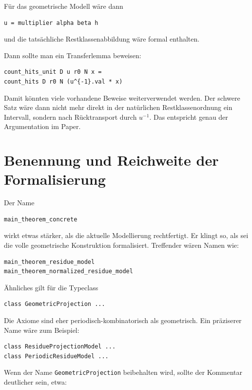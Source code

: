 \documentclass[11pt]{article}
\begin{document}
Für das geometrische Modell wäre dann

\begin{lstlisting}
u = multiplier alpha beta h
\end{lstlisting}

und die tatsächliche Restklassenabbildung wäre formal enthalten.

Dann sollte man ein Transferlemma beweisen:

\begin{lstlisting}
count_hits_unit D u r0 N x =
count_hits D r0 N (u^{-1}.val * x)
\end{lstlisting}

Damit könnten viele vorhandene Beweise weiterverwendet werden. Der schwere Satz wäre dann nicht mehr direkt in der natürlichen Restklassenordnung ein Intervall, sondern nach Rücktransport durch \(u^{-1}\). Das entspricht genau der Argumentation im Paper.

\section{Benennung und Reichweite der Formalisierung}

Der Name

\begin{lstlisting}
main_theorem_concrete
\end{lstlisting}

wirkt etwas stärker, als die aktuelle Modellierung rechtfertigt. Er klingt so, als sei die volle geometrische Konstruktion formalisiert. Treffender wären Namen wie:

\begin{lstlisting}
main_theorem_residue_model
main_theorem_normalized_residue_model
\end{lstlisting}

Ähnliches gilt für die Typeclass

\begin{lstlisting}
class GeometricProjection ...
\end{lstlisting}

Die Axiome sind eher periodisch-kombinatorisch als geometrisch. Ein präziserer Name wäre zum Beispiel:

\begin{lstlisting}
class ResidueProjectionModel ...
class PeriodicResidueModel ...
\end{lstlisting}

Wenn der Name \texttt{GeometricProjection} beibehalten wird, sollte der Kommentar deutlicher sein, etwa:
\end{document}
